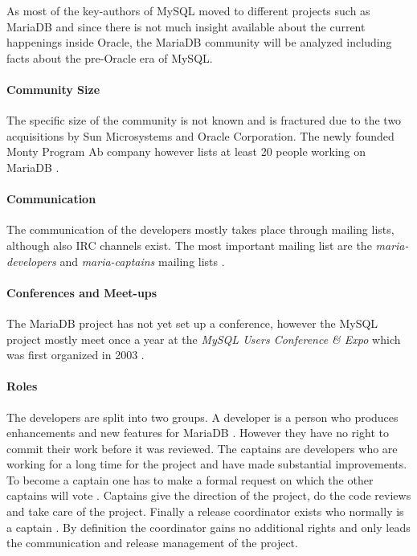 As most of the key-authors of MySQL moved to different projects such as MariaDB
and since there is not much insight available about the current happenings
inside Oracle, the MariaDB community will be analyzed including facts about the
pre-Oracle era of MySQL.

\paragraph{Community Size}

The specific size of the community is not known and is fractured due to
the two acquisitions by Sun Microsystems and Oracle Corporation. The newly
founded Monty Program Ab company however lists at least 20 people working on
MariaDB \cite{MySQLBehind}.

\paragraph{Communication}

The communication of the developers mostly takes place through mailing lists,
although also \ac{IRC} channels exist. The most important mailing list are the
\emph{maria-developers} and \emph{maria-captains} mailing lists
\cite{MySQLDevelopers}.

\paragraph{Conferences and Meet-ups}

The MariaDB project has not yet set up a conference, however the MySQL project
mostly meet once a year at the \emph{MySQL Users Conference \& Expo} which was
first organized in 2003 \cite{MySQLConference}.

\paragraph{Roles}

The developers are split into two groups. A developer is a person who produces
enhancements and new features for MariaDB
\cite{MySQLContributingCode,MySQLContributing,MySQLCaptain}. However they have
no right to commit their work before it was reviewed. The captains are
developers who are working for a long time for the project and have made
substantial improvements. To become a captain one has to make a formal request
on which the other captains will vote \cite{MySQLCaptain}. Captains give the
direction of the project, do the code reviews and take care of the project.
Finally a release coordinator exists who normally is a captain
\cite{MySQLReleaseCoordinator}. By definition the coordinator gains no
additional rights and only leads the communication and release management of
the project.

